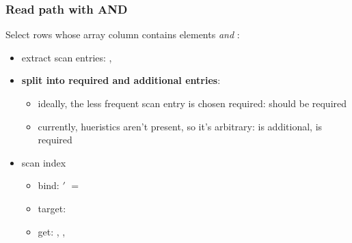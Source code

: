 \begin{frame}
  \frametitle{Read path with AND}
  Select rows whose array column contains elements  \emph{and}
  :

  \pause

  \begin{itemize}
    \item extract scan entries: , 
      \pause
    \item \textbf{split into required and additional entries}:
      \pause
      \begin{itemize}
        \item ideally, the less frequent scan entry is chosen required:
           should be required
          \pause
        \item currently, hueristics aren't present, so it's arbitrary:
           is additional,  is required
      \end{itemize}
      \pause
    \item scan index
      \begin{itemize}
        \item bind: $'$ $=$ 
        \item target: 
          \pause
        \item get: , , 
      \end{itemize}
  \end{itemize}
\end{frame}

